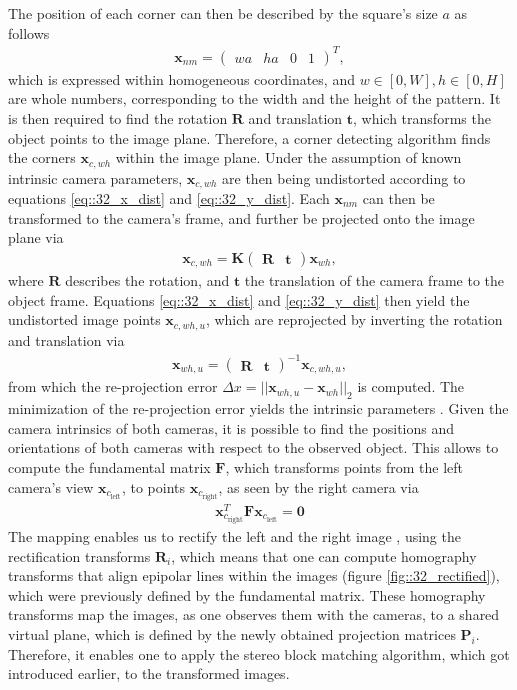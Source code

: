 The position of each corner can then be described by the square's size $a$ as follows
\begin{align}
	\bm{x}_{nm} = \begin{pmatrix}
	wa & ha & 0 & 1
	\end{pmatrix}^T,
	\label{eq::32_square_size}
\end{align}
which is expressed within homogeneous coordinates, and $w\in[0,W],h\in[0,H]$ are whole numbers, corresponding to the width and the height of the pattern. It is then required to find the rotation $\bm{R}$ and translation $\bm{t}$, which transforms the object points to the image plane. Therefore, a corner detecting algorithm finds the corners $\bm{x}_{c,wh}$ within the image plane. Under the assumption of known intrinsic camera parameters, $\bm{x}_{c,wh}$ are then being undistorted according to equations \ref{eq::32_x_dist} and \ref{eq::32_y_dist}. Each $\bm{x}_{nm}$ can then be transformed to the camera's frame, and further be projected onto the image plane via
\begin{align}
	\bm{x}_{c,wh} = \bm{K}\begin{pmatrix}
	\bm{R} & \bm{t}
	\end{pmatrix}\bm{x}_{wh},
\end{align}
where $\bm{R}$ describes the rotation, and $\bm{t}$ the translation of the camera frame to the object frame. Equations \ref{eq::32_x_dist} and \ref{eq::32_y_dist} then yield the undistorted image points $\bm{x}_{c,wh,u}$, which are reprojected by inverting the rotation and translation via
\begin{align}
	\bm{x}_{wh,u} = \begin{pmatrix}
	\bm{R} & \bm{t}
	\end{pmatrix}^{-1}\bm{x}_{c,wh,u},
	\label{eq::32_reprojection}
\end{align}
from which the re-projection error $\Delta x = ||\bm{x}_{wh,u} - \bm{x}_{wh}||_2$ is computed. The minimization of the re-projection error yields the intrinsic parameters \cite{zhang2000flexible}. Given the camera intrinsics of both cameras, it is possible to find the positions and orientations of both cameras with respect to the observed object. This allows to compute the fundamental matrix $\bm{F}$, which transforms points from the left camera's view $\bm{x}_{c_\text{left}}$, to points $\bm{x}_{c_\text{right}}$, as seen by the right camera via
\begin{align}
	\bm{x}_{c_\text{right}}^T\bm{F}\bm{x}_{c_\text{left}} = \bm{0}
\end{align}
The mapping enables us to rectify the left and the right image \cite{loop1999computing}, using the rectification transforms $\bm{R}_i$, which means that one can compute homography transforms that align epipolar lines within the images (figure \ref{fig::32_rectified}), which were previously defined by the fundamental matrix. These homography transforms map the images, as one observes them with the cameras, to a shared virtual plane, which is defined by the newly obtained projection matrices $\bm{P}_i$. Therefore, it enables one to apply the stereo block matching algorithm, which got introduced earlier, to the transformed images.